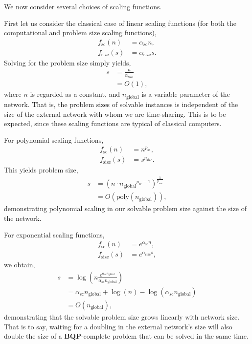 We now consider several choices of scaling functions.

First let us consider the classical case of linear scaling functions (for both the computational and problem size scaling functions),
\begin{align}
	f_\text{sc}(n) &= \alpha_\text{sc} n,\nonumber\\
	f_\text{size}(s) &= \alpha_\text{size} s.
\end{align}
Solving for the problem size simply yields,
\begin{align}
s &= \frac{n}{\alpha_\text{size}} \nonumber\\
&= O(1),
\end{align}
where $n$ is regarded as a constant, and $n_\text{global}$ is a variable parameter of the network. That is, the problem sizes of solvable instances is independent of the size of the external network with whom we are time-sharing. This is to be expected, since these scaling functions are typical of classical computers.

For polynomial scaling functions,
\begin{align}
f_\text{sc}(n) &= n^{p_\text{sc}},\nonumber\\
f_\text{size}(s) &= s^{p_\text{size}}.
\end{align}
This yields problem size,
\begin{align}
	s &= (n \cdot {n_\text{global}}^{p_\text{sc}-1})^\frac{1}{p_\text{size}} \nonumber\\
	&= O(\mathrm{poly}(n_\text{global})),
\end{align}
demonstrating polynomial scaling in our solvable problem size against the size of the network.

For exponential scaling functions,
\begin{align}
f_\text{sc}(n) &= e^{\alpha_\text{sc}n},\nonumber\\
f_\text{size}(s) &= e^{\alpha_\text{size}s},
\end{align}
we obtain,
\begin{align}
s &= \log\left(n \frac{e^{\alpha_\text{sc}n_\text{global}}}{\alpha_\text{sc}n_\text{global}}\right) \nonumber\\
&= \alpha_\text{sc}n_\text{global} + \log(n)-\log(\alpha_\text{sc}n_\text{global}) \nonumber\\
&= O(n_\text{global}),
\end{align}
demonstrating that the solvable problem size grows linearly with network size. That is to say, waiting for a doubling in the external network's size will also double the size of a \textbf{BQP}-complete problem that can be solved in the same time.

